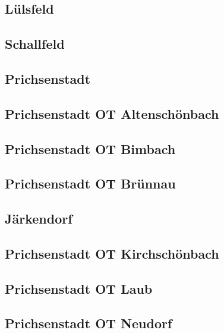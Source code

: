 \documentclass[fontsize=12pt,a4paper]{scrreprt}
\begin{document}
        \subsection{Lülsfeld}
        

        \subsection{Schallfeld}
        

        \subsection{Prichsenstadt}
        

        \subsection{Prichsenstadt OT Altenschönbach}
        

        \subsection{Prichsenstadt OT Bimbach}
        

        \subsection{Prichsenstadt OT Brünnau}
        

        \subsection{Järkendorf}
        

        \subsection{Prichsenstadt OT Kirchschönbach}
        

        \subsection{Prichsenstadt OT Laub}
        

        \subsection{Prichsenstadt OT Neudorf}
        
\end{document}
